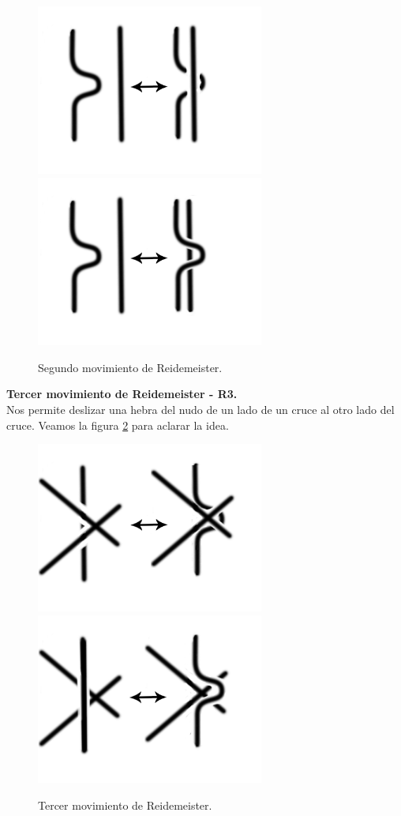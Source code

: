 \documentclass[14pt]{extarticle}
\begin{document}
    \begin{figure}[h!]
    	\includegraphics[width=7.5cm]{inudos/movi3.png}
    	\includegraphics[width=7.5cm]{inudos/movi4.png}
    	\centering
    	\caption{Segundo movimiento de Reidemeister.}
    	\label{movi2} 
    \end{figure}
    
	\textbf{Tercer movimiento de Reidemeister - R3.}\\
Nos permite deslizar una hebra del nudo de un lado de un cruce al otro lado del cruce. Veamos la figura \ref{movi3} para aclarar la idea.
      \begin{figure}[h!]
      	\includegraphics[width=7.5cm]{inudos/movi5.png}
      	\includegraphics[width=7.5cm]{inudos/movi6.png}
      	\centering
      	\caption{Tercer movimiento de Reidemeister.}
      	\label{movi3} 
      \end{figure}
  
\end{document}
